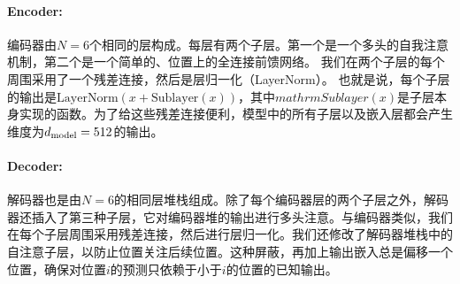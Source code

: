\paragraph{Encoder:} 编码器由$N=6$个相同的层构成。每层有两个子层。第一个是一个多头的自我注意机制，第二个是一个简单的、位置上的全连接前馈网络。  我们在两个子层的每个周围采用了一个残差连接\citep{he2016deep}，然后是层归一化（LayerNorm）\cite{layernorm2016}。 也就是说，每个子层的输出是$\mathrm{LayerNorm}(x + \mathrm{Sublayer}(x))$，其中$mathrm{Sublayer}(x)$是子层本身实现的函数。为了给这些残差连接便利，模型中的所有子层以及嵌入层都会产生维度为$d_{\text{model}}=512$的输出。


\paragraph{Decoder:} 解码器也是由$N=6$的相同层堆栈组成。除了每个编码器层的两个子层之外，解码器还插入了第三种子层，它对编码器堆的输出进行多头注意。与编码器类似，我们在每个子层周围采用残差连接，然后进行层归一化。我们还修改了解码器堆栈中的自注意子层，以防止位置关注后续位置。这种屏蔽，再加上输出嵌入总是偏移一个位置，确保对位置$i$的预测只依赖于小于$i$的位置的已知输出。


